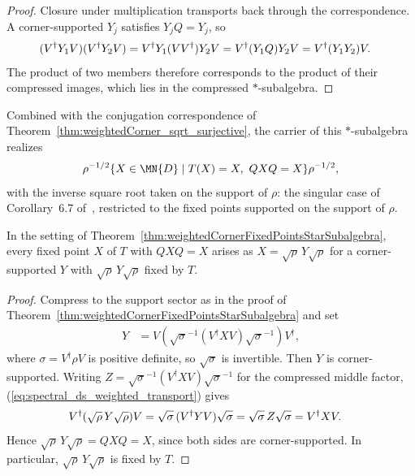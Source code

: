 \begin{proof}
    Closure under multiplication transports back through the correspondence.
    A corner-supported $Y_j$ satisfies $Y_jQ=Y_j$, so
    \begin{align}
        (V^\dagger Y_1V)(V^\dagger Y_2V)
         & =V^\dagger Y_1(VV^\dagger)Y_2V
        =V^\dagger(Y_1Q)Y_2V
        =V^\dagger(Y_1Y_2)V.
        \notag
    \end{align}
    The product of two members therefore corresponds to the product of
    their compressed images, which lies in the compressed
    $*$-subalgebra.
\end{proof}

Combined with the conjugation correspondence of
Theorem~\ref{thm:weightedCorner_sqrt_surjective}, the carrier of this
$*$-subalgebra realizes
\begin{align}
    \rho^{-1/2}
    \{X\in\MN{D}\mid T(X)=X,\ QXQ=X\}
    \rho^{-1/2},
    \notag
\end{align}
with the inverse square root taken on the support of $\rho$: the singular
case of Corollary~6.7 of~\cite{Wolf2012Quantum}, restricted to the fixed
points supported on the support of $\rho$.

\begin{theorem}%
    \label{thm:weightedCorner_sqrt_surjective}
    \leanok
    In the setting of
    Theorem~\ref{thm:weightedCornerFixedPointsStarSubalgebra}, every fixed
    point $X$ of $T$ with $QXQ=X$ arises as
    $X=\sqrt{\rho}\,Y\sqrt{\rho}$ for a corner-supported $Y$ with
    $\sqrt{\rho}\,Y\sqrt{\rho}$ fixed by $T$.
\end{theorem}

\begin{proof}
    \leanok
    Compress to the support sector as in the proof of
    Theorem~\ref{thm:weightedCornerFixedPointsStarSubalgebra} and set
    \begin{align}
        Y
         & =V\left(\sqrt{\sigma}^{-1}(V^\dagger XV)
        \sqrt{\sigma}^{-1}\right)V^\dagger,
        \label{eq:spectral_ds_weighted_preimage}
    \end{align}
    where $\sigma=V^\dagger\rho V$ is positive definite, so
    $\sqrt{\sigma}$ is invertible. Then $Y$ is corner-supported. Writing
    $Z=\sqrt{\sigma}^{-1}(V^\dagger XV)\sqrt{\sigma}^{-1}$ for the
    compressed middle factor, (\ref{eq:spectral_ds_weighted_transport})
    gives
    \begin{align}
        V^\dagger(\sqrt{\rho}\,Y\sqrt{\rho})V
         & =\sqrt{\sigma}\,(V^\dagger YV)\sqrt{\sigma}
        =\sqrt{\sigma}\,Z\sqrt{\sigma}
        =V^\dagger XV.
        \notag
    \end{align}
    Hence $\sqrt{\rho}\,Y\sqrt{\rho}=QXQ=X$, since both sides are
    corner-supported. In particular, $\sqrt{\rho}\,Y\sqrt{\rho}$ is fixed
    by $T$.
\end{proof}

